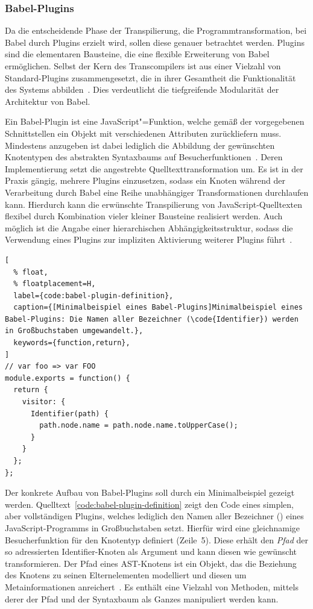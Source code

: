 \subsubsection{Babel-Plugins}
\label{sec:babel-plugins}

Da die entscheidende Phase der Transpilierung, die Programmtransformation, bei Babel durch Plugins erzielt wird, sollen diese genauer betrachtet werden. Plugins sind die elementaren Bausteine, die eine flexible Erweiterung von Babel ermöglichen. Selbst der Kern des Transcompilers ist aus einer Vielzahl von Standard-Plugins zusammengesetzt, die in ihrer Gesamtheit die Funktionalität des Systems abbilden~\autocite{BABEL}. Dies verdeutlicht die tiefgreifende Modularität der Architektur von Babel.

Ein Babel-Plugin ist eine JavaScript"=Funktion, welche gemäß der vorgegebenen Schnittstellen ein Objekt mit verschiedenen Attributen zurückliefern muss. Mindestens anzugeben ist dabei lediglich die Abbildung der gewünschten Knotentypen des abstrakten Syntaxbaums auf Besucherfunktionen~\autocite{BABEL:HANDBOOK}. Deren Implementierung setzt die angestrebte Quelltexttransformation um. Es ist in der Praxis gängig, mehrere Plugins einzusetzen, sodass ein Knoten während der Verarbeitung durch Babel eine Reihe unabhängiger Transformationen durchlaufen kann. Hierdurch kann die erwünschte Transpilierung von JavaScript-Quelltexten flexibel durch Kombination vieler kleiner Bausteine realisiert werden. Auch möglich ist die Angabe einer hierarchischen Abhängigkeitsstruktur, sodass die Verwendung eines Plugins zur impliziten Aktivierung weiterer Plugins führt~\autocite{BABEL:HANDBOOK}.

\begin{lstlisting}[
  % float,
  % floatplacement=H,
  label={code:babel-plugin-definition},
  caption={[Minimalbeispiel eines Babel-Plugins]Minimalbeispiel eines Babel-Plugins: Die Namen aller Bezeichner (\code{Identifier}) werden in Großbuchstaben umgewandelt.},
  keywords={function,return},
]
// var foo => var FOO
module.exports = function() {
  return {
    visitor: {
      Identifier(path) {
        path.node.name = path.node.name.toUpperCase();
      }
    }
  };
};
\end{lstlisting}

Der konkrete Aufbau von Babel-Plugins soll durch ein Minimalbeispiel gezeigt werden. Quelltext~\ref{code:babel-plugin-definition} zeigt den Code eines simplen, aber vollständigen Plugins, welches lediglich den Namen aller Bezeichner () eines JavaScript-Programms in Großbuchstaben setzt. Hierfür wird eine gleichnamige Besucherfunktion für den Knotentyp  definiert (Zeile~5). Diese erhält den \emph{Pfad} der so adressierten Identifier-Knoten als Argument und kann diesen wie gewünscht transformieren. Der Pfad eines AST-Knotens ist ein Objekt, das die Beziehung des Knotens zu seinen Elternelementen modelliert und diesen um Metainformationen anreichert~\autocite{BABEL:HANDBOOK}. Es enthält eine Vielzahl von Methoden, mittels derer der Pfad und der Syntaxbaum als Ganzes manipuliert werden kann.

